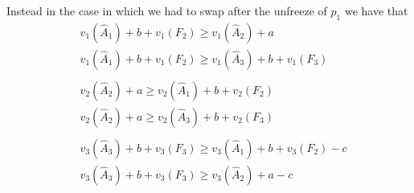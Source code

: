 \documentclass{article}
\begin{document}


Instead in the case in which we had to swap after the unfreeze of $p_1$ we have that
\begin{align*}
    &v_1(\hat A_1) + b + v_1(F_2) \ge v_1(\hat A_2) + a\\
    &v_1(\hat A_1) + b + v_1(F_2) \ge v_1(\hat A_3) + b + v_1(F_3)\\
    \\
    &v_2(\hat A_2) + a \ge v_2(\hat A_1) + b + v_2(F_2) \\
    &v_2(\hat A_2) + a \ge v_2(\hat A_3) + b + v_2(F_3)\\
    \\
    &v_3(\hat A_3) + b + v_3(F_3) \ge v_3(\hat A_1) + b + v_3(F_2) - c\\
    &v_3(\hat A_3) + b + v_3(F_3) \ge v_3(\hat A_2) + a - c\\
\end{align*}
\end{document}

